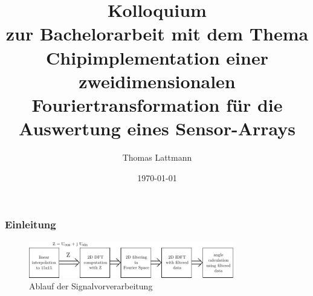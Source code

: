 

\title[Chipimplementation einer 2D-DFT für die Auswertung eines Sensor-Arrays]{\textbf{Kolloquium}\\ 
\medskip  \small{zur Bachelorarbeit mit dem Thema}\\
\medskip \large{Chipimplementation einer zweidimensionalen Fouriertransformation für die Auswertung eines Sensor-Arrays}}  

\author[TL]{Thomas Lattmann}
\date[\today]{\today} 



\begin{frame}[plain]
 	\titlepage
\end{frame}



\begin{frame}\frametitle{Einleitung}
 \begin{figure}[ht!]
 \centering
 \includegraphics[width=0.8\textwidth]{img/AblaufFourier.pdf}
 \caption{Ablauf der Signalvorverarbeitung}%
 \label{pic:AblaufFourier}
\end{figure}

\end{frame}


